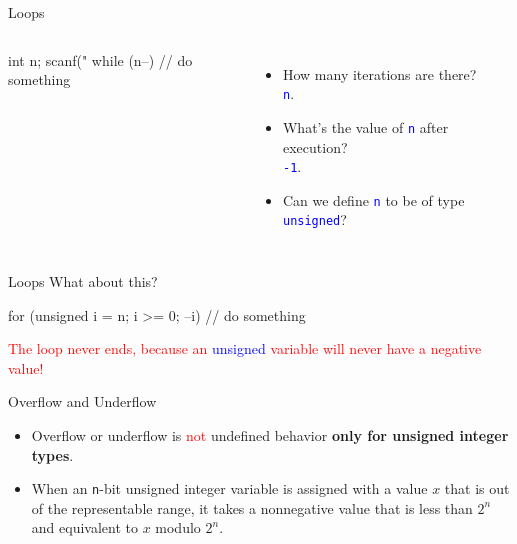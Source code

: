 \documentclass{beamer}
\newcommand{\red}[1]{\textcolor{red}{#1}}
\newcommand{\blue}[1]{\textcolor{blue}{#1}}
\newcommand{\ttt}[1]{\texttt{#1}}
\newcommand{\bluett}[1]{\blue{\ttt{#1}}}
\begin{document}
\begin{frame}[fragile]{Loops}
    \begin{columns}
        \begin{cpp}
int n;
scanf("%
while (n--) {
  // do something
}
        \end{cpp}
        \begin{itemize}
            \item How many iterations are there?\\
            \pause
            \bluett{n}.
            \pause
            \item What's the value of \bluett{n} after execution?\\
            \pause
            \bluett{-1}.
            \pause
            \item Can we define \bluett{n} to be of type \bluett{unsigned}?
        \end{itemize}
    \end{columns}
\end{frame}

\begin{frame}[fragile]{Loops}
    What about this?
    \begin{cpp}
for (unsigned i = n; i >= 0; --i) {
  // do something
}
    \end{cpp}
    \pause
    \red{The loop never ends, because an }\blue{unsigned }\red{variable will never have a negative value!}
\end{frame}

\begin{frame}{Overflow and Underflow}
    \begin{itemize}
        \item Overflow or underflow is \red{not} undefined behavior \textbf{only for unsigned integer types}.
        \item When an \ttt{n}-bit unsigned integer variable is assigned with a value \(x\) that is out of the representable range, it takes a nonnegative value that is less than \(2^n\) and equivalent to \(x\) modulo \(2^n\).
    \end{itemize}
\end{frame}
\end{document}
